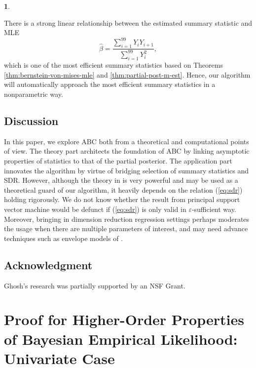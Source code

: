 \documentclass[oneside,english]{amsbook}
\numberwithin{section}{chapter}
\numberwithin{equation}{section}
\numberwithin{figure}{section}
\theoremstyle{plain}
\theoremstyle{plain}
\theoremstyle{definition}
\theoremstyle{plain}
\theoremstyle{plain}
\theoremstyle{remark}
\theoremstyle{definition}
\newtheorem{example}{\protect\examplename}
\theoremstyle{definition}
\providecommand{\examplename}{Example}
\begin{document}
\begin{example}
\begin{figure}
\end{figure}
There is a strong linear relationship between the estimated summary
statistic and MLE 
\[
\hat{\beta}=\frac{\sum_{i=1}^{99}Y_{i}Y_{i+1}}{\sum_{i=1}^{99}Y_{i}^{2}},
\]
which is one of the most efficient summary {{} } {statistics
} based on Theorems \ref{thm:bernstein-von-mises-mle} and \ref{thm:partial-post-m-est}.
Hence, our algorithm will automatically approach the most efficient
summary statistics in a nonparametric way. 
\end{example}

\section{\label{sec:Discussion}Discussion}

In this paper, we explore ABC both from a theoretical and computational
points of view. The theory part architects the foundation of ABC by
linking asymptotic properties of statistics to that of the partial
posterior. The application part innovates the algorithm by virtue
of bridging selection of summary statistics and SDR. However, although
the theory in \citet{li1992principal} is very powerful and may be
used as a theoretical guard of our algorithm, it heavily depends on
the relation (\ref{eq:sdr}) holding rigorously. We do not know whether
the result from principal support vector machine would be defunct
if (\ref{eq:sdr}) is only valid in $\varepsilon$-sufficient way.
Moreover, bringing in dimension reduction regression settings perhaps
moderates the usage when there are multiple parameters of interest,
and may need advance techniques such as envelope models of \citet{su2011partial,su2012inner}. 


\section*{Acknowledgment}

Ghosh's research was partially supported by an NSF Grant.

\appendix
\chapter{Proof for Higher-Order Properties of Bayesian Empirical Likelihood:
Univariate Case}
\end{document}
